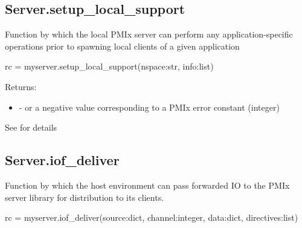 \subsection{Server.setup_local_support}

\summary
Function by which the local \ac{PMIx} server can perform any application-specific operations prior to spawning local clients of a given application

\format

\pyspecificstart
\begin{codepar}
rc = myserver.setup_local_support(nspace:str, info:list)
\end{codepar}
\pyspecificend


\begin{arglist}
\end{arglist}

Returns:

\begin{itemize}
    \item {} -  or a negative value corresponding to a PMIx error constant (integer)
\end{itemize}


See  for details


\subsection{Server.iof_deliver}

\summary
Function by which the host environment can pass forwarded \ac{IO} to the \ac{PMIx} server library for distribution to its clients.

\format

\pyspecificstart
\begin{codepar}
rc = myserver.iof_deliver(source:dict, channel:integer,
                          data:dict, directives:list)
\end{codepar}
\pyspecificend


\begin{arglist}
\end{arglist}

